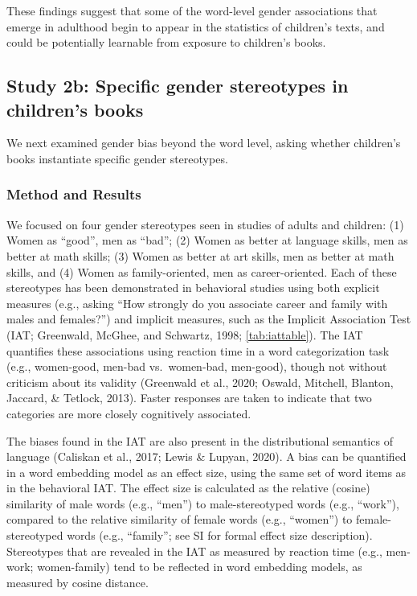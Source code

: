 \documentclass[
  english,
  ,man,floatsintext]{apa6}
\begin{document}
These findings suggest that some of the word-level gender associations that emerge in adulthood begin to appear in the statistics of children's texts, and could be potentially learnable from exposure to children's books.

\hypertarget{study-2b-specific-gender-stereotypes-in-childrens-books}{%
\subsection{Study 2b: Specific gender stereotypes in children's books}\label{study-2b-specific-gender-stereotypes-in-childrens-books}}

We next examined gender bias beyond the word level, asking whether children's books instantiate specific gender stereotypes.

\hypertarget{method-and-results-2}{%
\subsubsection{Method and Results}\label{method-and-results-2}}

We focused on four gender stereotypes seen in studies of adults and children: (1) Women as \enquote{good}, men as \enquote{bad}; (2) Women as better at language skills, men as better at math skills; (3) Women as better at art skills, men as better at math skills, and (4) Women as family-oriented, men as career-oriented. Each of these stereotypes has been demonstrated in behavioral studies using both explicit measures (e.g., asking \enquote{How strongly do you associate career and family with males and females?}) and implicit measures, such as the Implicit Association Test (IAT; Greenwald, McGhee, and Schwartz, 1998; \autoref{tab:iattable}). The IAT quantifies these associations using reaction time in a word categorization task (e.g., women-good, men-bad vs.~women-bad, men-good), though not without criticism about its validity (Greenwald et al., 2020; Oswald, Mitchell, Blanton, Jaccard, \& Tetlock, 2013). Faster responses are taken to indicate that two categories are more closely cognitively associated.

The biases found in the IAT are also present in the distributional semantics of language (Caliskan et al., 2017; Lewis \& Lupyan, 2020). A bias can be quantified in a word embedding model as an effect size, using the same set of word items as in the behavioral IAT. The effect size is calculated as the relative (cosine) similarity of male words (e.g., \enquote{men}) to male-stereotyped words (e.g., \enquote{work}), compared to the relative similarity of female words (e.g., \enquote{women}) to female-stereotyped words (e.g., \enquote{family}; see SI for formal effect size description). Stereotypes that are revealed in the IAT as measured by reaction time (e.g., men-work; women-family) tend to be reflected in word embedding models, as measured by cosine distance.
\end{document}
